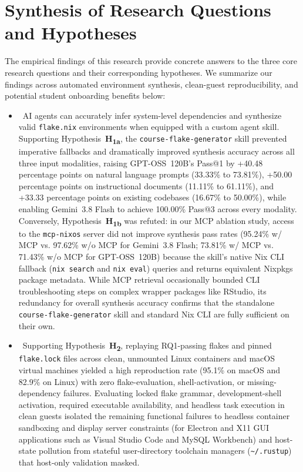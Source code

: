 \section{Synthesis of Research Questions and Hypotheses}

The empirical findings of this research provide concrete answers to the three
core research questions and their corresponding hypotheses. We summarize our findings
across automated environment synthesis, clean-guest reproducibility, and potential
student onboarding benefits below:

\begin{itemize}
    \item \rqonetitle\ AI agents can accurately infer system-level dependencies and
        synthesize valid \texttt{flake.nix} environments when equipped with a
        custom agent skill. Supporting Hypothesis~\textbf{H\textsubscript{1a}}, the
        \texttt{course-flake-generator} skill prevented imperative fallbacks and
        dramatically improved synthesis accuracy across all three input
        modalities, raising GPT-OSS~120B's Pass@1 by +40.48 percentage points on
        natural language prompts (33.33\% to 73.81\%), +50.00 percentage points
        on instructional documents (11.11\% to 61.11\%), and +33.33 percentage
        points on existing codebases (16.67\% to 50.00\%), while enabling Gemini~3.8
        Flash to achieve 100.00\% Pass@3 across every modality. Conversely,
        Hypothesis~\textbf{H\textsubscript{1b}} was refuted: in our MCP ablation
        study, access to the \texttt{mcp-nixos} server did not improve synthesis
        pass rates (95.24\% w/ MCP vs. 97.62\% w/o MCP for Gemini~3.8 Flash;
        73.81\% w/ MCP vs. 71.43\% w/o MCP for GPT-OSS~120B) because the skill's native
        Nix CLI fallback (\texttt{nix search} and \texttt{nix eval}) queries and returns
        equivalent Nixpkgs package metadata. While MCP retrieval occasionally
        bounded CLI troubleshooting steps on complex wrapper packages like
        RStudio, its redundancy for overall synthesis accuracy confirms that the standalone
        \texttt{course-flake-generator} skill and standard Nix CLI are fully
        sufficient on their own.

    \item \rqtwotitle\ Supporting Hypothesis~\textbf{H\textsubscript{2}}, replaying
        RQ1-passing flakes and pinned \texttt{flake.lock} files across clean, unmounted
        Linux containers and macOS virtual machines yielded a high reproduction rate
        (95.1\% on macOS and 82.9\% on Linux) with zero flake-evaluation, shell-activation,
        or missing-dependency failures. Evaluating locked flake grammar, development-shell
        activation, required executable availability, and headless task execution
        in clean guests isolated the remaining functional failures to headless container
        sandboxing and display server constraints (for Electron and X11 GUI
        applications such as Visual Studio Code and MySQL Workbench) and host-state
        pollution from stateful user-directory toolchain managers (\texttt{\textasciitilde/.rustup})
        that host-only validation masked.


\end{itemize}
